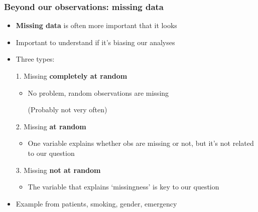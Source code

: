 \documentclass[aspectratio=43]{beamer}
\begin{document}
\begin{frame}
\frametitle{Beyond our observations: missing data}
\centering

\begin{itemize}
  \item \textbf{Missing data} is often more important that it looks
  \item Important to understand if it's biasing our analyses
  \item Three types:
  \item[1.] Missing \textbf{completely at random}
  \begin{itemize}
    \item No problem, random observations are missing
    \item[] (Probably not very often)
  \end{itemize}
  \item[2.] Missing \textbf{at random}
  \begin{itemize}
    \item One variable explains whether obs are missing or not, but it's not related to our question
  \end{itemize}
  \item[3.] Missing \textbf{not at random}
  \begin{itemize}
    \item The variable that explains `missingness' is key to our question
  \end{itemize}
  \item[]
  \item Example from patients, smoking, gender, emergency
\end{itemize}




\end{frame}
\end{document}
